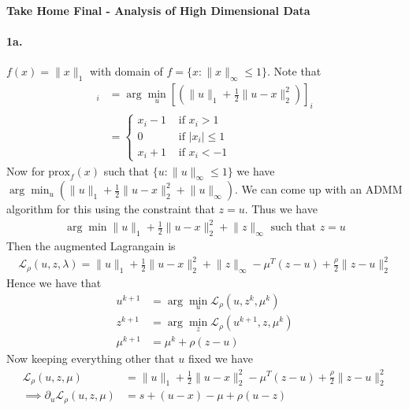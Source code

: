 \documentclass[12pt, leqno]{article}
\providecommand{\abs}[1]{\lvert#1\rvert}
\providecommand{\norm}[1]{\lVert#1\rVert}
\newcommand{\prox}{\mathrm{prox}}
\begin{document}
\pagestyle{fancy}

\begin{center}
{\large {\bf Take Home Final - Analysis of High Dimensional Data}} \\
\end{center}

\paragraph{1a.} $f(x) = \norm{x}_1$ with domain of $f =
\{x:\norm{x}_{\infty} \leq 1\}$. 
Note that 
\begin{align*}
  [\prox_{f}(x)]_i &= \arg\min_{u}[(\norm{u}_1 + \frac{1}{2} \norm{u-x}_2^2)]_i\\
  &= \begin{cases} x_i-1 & \text{ if } x_i>1 \\
0 & \text{ if } \abs{x_i} \leq 1 \\
x_i + 1 & \text{ if } x_i<-1
\end{cases}
\end{align*}
Now for $\prox_{f}(x)$ such that $\{u:\norm{u}_{\infty} \leq 1\}$ we
have $\arg\min_{u} (\norm{u}_1 + \frac{1}{2} \norm{u-x}_2^2 + 
\norm{u}_{\infty})$. We can come up with an ADMM algorithm for this
using the constraint that $z = u$. Thus we have 
\begin{align*}
\arg\min \norm{u}_1 + \frac{1}{2} \norm{u-x}_2^2 + 
\norm{z}_{\infty} \text{ such that } z=u
\end{align*}
Then the augmented Lagrangain is 
\begin{align*}
  \mathcal{L}_{\rho}(u,z,\lambda) = \norm{u}_1 + \frac{1}{2} \norm{u-x}_2^2 + 
\norm{z}_{\infty} - \mu^T(z-u) + \frac{\rho}{2}\norm{z-u}_2^2
\end{align*}
Hence we have that 
\begin{align*}
u^{k+1} &= \arg\min_{u} \mathcal{L}_{\rho}(u,z^{k},\mu^{k}) \\
z^{k+1} &= \arg\min_{z} \mathcal{L}_{\rho}(u^{k+1},z,\mu^{k}) \\
\mu^{k+1} &= \mu^{k} + \rho(z-u)
\end{align*}
Now keeping everything other that $u$ fixed we have 
\begin{align*}
  \mathcal{L}_{\rho}(u,z,\mu) &= \norm{u}_1 + \frac{1}{2}
  \norm{u-x}_2^2 - \mu^T(z-u) + \frac{\rho}{2}\norm{z-u}_2^2
  \\
\implies \partial_u \mathcal{L}_{\rho}(u,z,\mu) &= s + (u-x) -
  \mu + \rho (u-z)
\end{align*}
\end{document}
